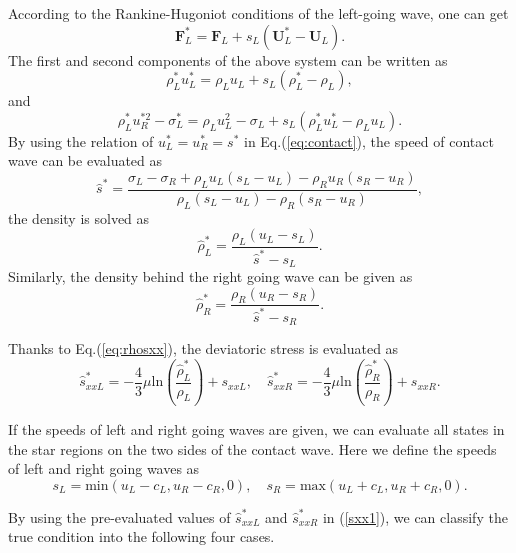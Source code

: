 \documentclass[review]{elsarticle}
\begin{document}
According to the Rankine-Hugoniot conditions of  the  left-going  wave, one can get
\begin{equation} \label{eq:RH1}
    \mathbf{F}_L^* = \mathbf{F}_L+s_L (\mathbf{U}_L^*-\mathbf{U}_L).
\end{equation}
The first and second components of the above system can be written as
\begin{equation} \label{eq:rhoLstar}
  \rho_L^* u_L^*=\rho_L u_L+s_L(\rho_L^*-\rho_L),
\end{equation}
and
\begin{equation}\label{eq:sigma}
  \rho_L^* u_R^{*2}-\sigma^*_L=\rho_L u_L^2-\sigma_L+s_L(\rho_L^* u_L^*-\rho_L u_L).
\end{equation}
By using the relation of $u_L^* =u_R^* = s^*$ in Eq.(\ref{eq:contact}), the speed of contact wave can be evaluated as
\begin{equation}
 \hat{s}^* = \frac{\sigma_L-\sigma_R+\rho_L u_L(s_L-u_L)-\rho_R u_R(s_R-u_R)}{\rho_L(s_L-u_L)-\rho_R(s_R-u_R)},
\end{equation}
the density is solved as
\begin{equation}\label{eq:rhoLs}
  \hat{\rho}_L^* = \frac{\rho_L(u_L-s_L)}{\hat{s}^*-s_L}.
\end{equation}
Similarly, the density behind the right going wave can be given as
\begin{equation}\label{eq:rhoLs}
  \hat{\rho}_R^* = \frac{\rho_R(u_R-s_R)}{\hat{s}^*-s_R}.
\end{equation}

Thanks to Eq.(\ref{eq:rhosxx}),  the deviatoric stress is evaluated as
\begin{equation}  \label{sxx1}
  \hat{s}_{xxL}^*=-\frac{4}{3}\mu\text{ln}(\frac{\hat{\rho}_L^*}{\rho_L})+s_{xxL}, \quad   \hat{s}_{xxR}^*=-\frac{4}{3}\mu\text{ln}(\frac{\hat{\rho}_R^*}{\rho_R})+s_{xxR}.
\end{equation}

If the speeds of left and right going waves are given, we can evaluate all states in the star regions on the two sides of  the contact wave. Here we define the speeds of left and right going waves as
    \begin{equation}\label{eq:sLR}
      s_L = \text{min} (u_L-c_L, u_R-c_R, 0),  \quad s_R = \text{max}(u_L+c_L, u_R+c_R, 0).
    \end{equation}

By using the pre-evaluated values of $\hat{s}_{xxL}^*$ and $\hat{s}_{xxR}^*$ in (\ref{sxx1}), we can classify the true condition into the following four cases.
\end{document}
